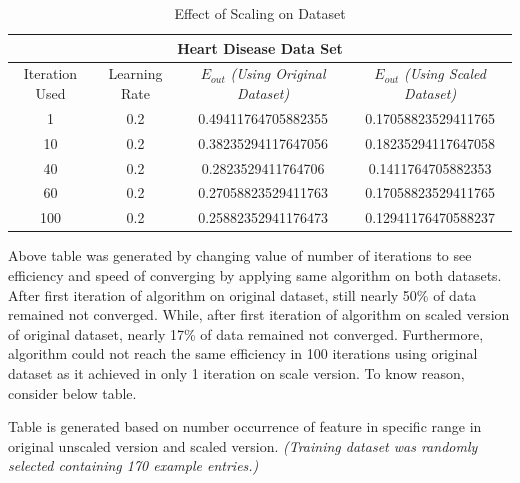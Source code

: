 \documentclass{article}
\begin{document}
\begin{table}[H]
\begin{center}
\begin{tabular}{ |c|c|c|c| } 
\hline
\multicolumn{4}{|c|}{Heart Disease Data Set} \\
\hline
\hline
Iteration Used & Learning Rate & \(E_{out}\) \textit{(Using Original Dataset)} & \(E_{out}\) \textit{(Using Scaled Dataset)} \\
\hline
\hline
1 & 0.2 & 0.49411764705882355 & 0.17058823529411765 \\ 

\hline
\hline
10 & 0.2 & 0.38235294117647056 & 0.18235294117647058 \\
\hline
\hline
40 & 0.2 & 0.2823529411764706 & 0.1411764705882353 \\


\hline
\hline
60 & 0.2 & 0.27058823529411763 & 0.17058823529411765 \\


\hline
\hline
100 & 0.2 & 0.25882352941176473 & 0.12941176470588237 \\

\hline
\end{tabular}
\caption{Effect of Scaling on Dataset}
\end{center}
\end{table}
\par Above table was generated by changing value of number of iterations to see efficiency and speed of converging by applying same algorithm on both datasets. After first iteration of algorithm on original dataset, still nearly 50\% of data remained not converged. While, after first iteration of algorithm on scaled version of original dataset, nearly 17\% of data remained not converged. Furthermore, algorithm could not reach the same efficiency in 100 iterations using original dataset as it achieved in only 1 iteration on scale version. To know reason, consider below table.  
\par Table is generated based on number occurrence of feature in specific range in original unscaled version and scaled version. \textit{(Training dataset was randomly selected containing 170 example entries.)}
\end{document}
